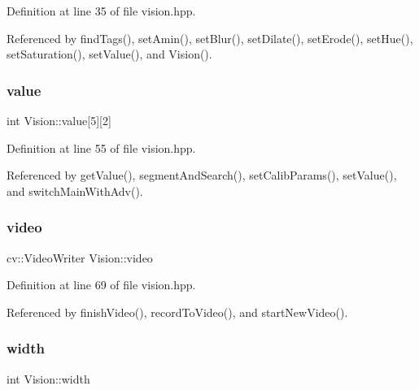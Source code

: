 Definition at line 35 of file vision.\+hpp.



Referenced by find\+Tags(), set\+Amin(), set\+Blur(), set\+Dilate(), set\+Erode(), set\+Hue(), set\+Saturation(), set\+Value(), and Vision().

\mbox{\label{class_vision_ad76f296d21c0758ed68429ca8b237b03}} 
\subsubsection{\texorpdfstring{value}{value}}
{\footnotesize\ttfamily int Vision\+::value\mbox{[}5\mbox{]}\mbox{[}2\mbox{]}\hspace{0.3cm}{\ttfamily [private]}}



Definition at line 55 of file vision.\+hpp.



Referenced by get\+Value(), segment\+And\+Search(), set\+Calib\+Params(), set\+Value(), and switch\+Main\+With\+Adv().

\mbox{\label{class_vision_a65230f76c9af171a0a9faba81b57f3d5}} 
\subsubsection{\texorpdfstring{video}{video}}
{\footnotesize\ttfamily cv\+::\+Video\+Writer Vision\+::video\hspace{0.3cm}{\ttfamily [private]}}



Definition at line 69 of file vision.\+hpp.



Referenced by finish\+Video(), record\+To\+Video(), and start\+New\+Video().

\mbox{\label{class_vision_ac82a1da77a8b08d112e5c4688bd70c3d}} 
\subsubsection{\texorpdfstring{width}{width}}
{\footnotesize\ttfamily int Vision\+::width\hspace{0.3cm}{\ttfamily [private]}}



